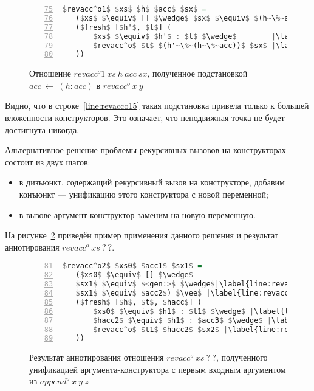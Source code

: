 \begin{figure}[h!]
  \begin{center}
  \begin{minipage}{0.65\textwidth}
  \begin{lstlisting}[language=Haskell, frame=single, numbers=left,numberstyle=\small, firstnumber=75, escapechar=|]
 $revacc^o1$ $xs$ $h$ $acc$ $sx$ =
   ($xs$ $\equiv$ [] $\wedge$ $sx$ $\equiv$ $(h~\%~acc)$) $\vee$ |\label{line:revacco12}|
   ($fresh$ [$h'$, $t$] (
       $xs$ $\equiv$ $h'$ : $t$ $\wedge$        |\label{line:revacco14}|
       $revacc^o$ $t$ $(h'~\%~(h~\%~acc))$ $sx$ |\label{line:revacco15}|
   ))
    \end{lstlisting}
  \end{minipage}
  \end{center}
  \caption{Отношение $revacc^o1 \ xs \ h \ acc \ sx$, полученное подстановкой $acc~\gets~(h:acc)$ в $revacc^o \ x \ y$}
  \label{lst:revacco1}
\end{figure}

Видно, что в строке~\ref{line:revacco15} такая подстановка привела только к большей вложенности конструкторов.
Это означает, что неподвижная точка не будет достигнута никогда.

Альтернативное решение проблемы рекурсивных вызовов на конструкторах состоит из двух шагов:
\begin{itemize}
    \item в дизъюнкт, содержащий рекурсивный вызов на конструкторе, добавим конъюнкт --- унификацию этого конструктора с новой переменной;
    \item в вызове аргумент-конструктор заменим на новую переменную.
\end{itemize}

На рисунке~\ref{lst:revacco2IOOANN} приведён пример применения данного решения и результат аннотирования $revacc^o \ xs \ ? \ ?$.

\begin{figure}[h!]
  \begin{center}
  \begin{minipage}{0.53\textwidth}
  \begin{lstlisting}[language=Haskell, frame=single, numbers=left,numberstyle=\small, firstnumber=81, escapechar=|]
 $revacc^o2$ $xs0$ $acc1$ $sx1$ =
   ($xs0$ $\equiv$ [] $\wedge$
   $sx1$ $\equiv$ $<gen:>$ $\wedge$|\label{line:revacco2IOOANN2}|
   $sx1$ $\equiv$ $acc2$) $\vee$ |\label{line:revacco2IOOANN3}|
   ($fresh$ [$h$, $t$, $hacc$] (
       $xs0$ $\equiv$ $h1$ : $t1$ $\wedge$ |\label{line:revacco2IOOANN5}|
       $hacc2$ $\equiv$ $h1$ : $acc3$ $\wedge$ |\label{line:revacco2IOOANN6}|
       $revacc^o$ $t1$ $hacc2$ $sx2$ |\label{line:revacco2IOOANN7}|
   ))
    \end{lstlisting}
  \end{minipage}
  \end{center}
  \caption{Результат аннотирования отношения $revacc^o \ xs \ ? \ ?$, полученного унификацией аргумента-конструктора с первым входным аргументом из $append^o \ x \ y \ z$}
  \label{lst:revacco2IOOANN}
\end{figure}

